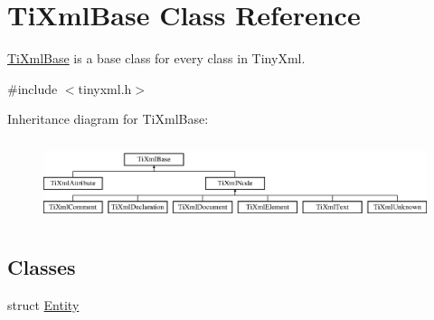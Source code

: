 \hypertarget{class_ti_xml_base}{
\section{TiXmlBase Class Reference}
\label{class_ti_xml_base}
}


\hyperlink{class_ti_xml_base}{TiXmlBase} is a base class for every class in TinyXml.  




{\ttfamily \#include $<$tinyxml.h$>$}

Inheritance diagram for TiXmlBase:\begin{figure}[H]
\begin{center}
\leavevmode
\includegraphics[height=2.413793cm]{class_ti_xml_base}
\end{center}
\end{figure}
\subsection*{Classes}
\begin{DoxyCompactItemize}
\item 
struct \hyperlink{struct_ti_xml_base_1_1_entity}{Entity}
\end{DoxyCompactItemize}
